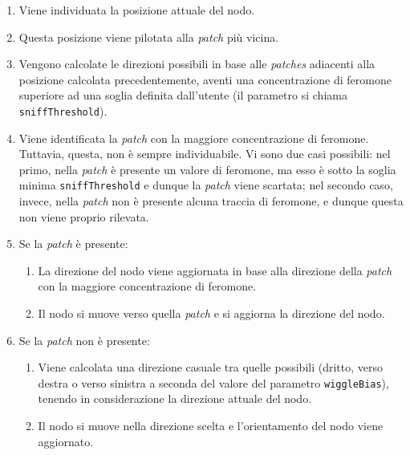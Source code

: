 \begin{enumerate}
    \item Viene individuata la posizione attuale del nodo.
    \item Questa posizione viene pilotata alla \textit{patch} più vicina.
    \item Vengono calcolate le direzioni possibili in base alle \textit{patches} adiacenti alla posizione calcolata precedentemente, aventi una 
    concentrazione di feromone superiore ad una soglia definita dall'utente (il parametro si chiama \texttt{sniffThreshold}).
    \item Viene identificata la \textit{patch} con la maggiore concentrazione di feromone. Tuttavia, questa, non è sempre individuabile. Vi sono due casi possibili: nel primo, 
        nella \textit{patch} è presente un valore di feromone, ma esso è sotto la soglia minima \texttt{sniffThreshold} e dunque la \textit{patch} viene scartata;
         nel secondo caso, invece, nella \textit{patch} non è presente alcuna traccia di feromone, e dunque questa non viene proprio rilevata.
    \item Se la \textit{patch} è presente:
    \begin{enumerate}
        \item La direzione del nodo viene aggiornata in base alla direzione della \textit{patch} con la maggiore concentrazione di feromone.
        \item Il nodo si muove verso quella \textit{patch} e si aggiorna la direzione del nodo.
    \end{enumerate}
    \item Se la \textit{patch} non è presente:
    \begin{enumerate}
        \item Viene calcolata una direzione casuale tra quelle possibili (dritto, verso destra o verso sinistra a seconda del valore del parametro \texttt{wiggleBias}),
        tenendo in considerazione la direzione attuale del nodo.
        \item Il nodo si muove nella direzione scelta e l'orientamento del nodo viene aggiornato.
    \end{enumerate}
\end{enumerate}

